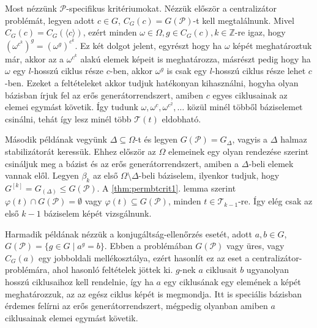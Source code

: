Most nézzünk $\mathcal{P}$-specifikus kritériumokat.
Nézzük először a centralizátor problémát, legyen adott $c \in G$, $C_G(c) = G(\mathcal{P})$-t kell megtalálnunk.
Mivel $C_G(c) = C_G(\langle c \rangle)$, ezért minden $\omega \in \Omega, g \in C_G(c), k \in \mathbb{Z}$-re igaz, hogy $(\omega^{c^k})^g = (\omega^g)^{c^k}$.
Ez két dolgot jelent, egyrészt hogy ha $\omega$ képét meghatároztuk már, akkor az a $\omega^{c^k}$ alakú elemek képeit is meghatározza,
másrészt pedig hogy ha $\omega$ egy $l$-hosszú ciklus része $c$-ben, akkor $\omega^g$ is csak egy $l$-hosszú ciklus része lehet $c$-ben.
Ezeket a feltételeket akkor tudjuk hatékonyan kihasználni, hogyha olyan bázisban írjuk fel az erős generátorrendszert, amiben $c$ egyes ciklusainak az elemei egymást követik.
Így tudunk $\omega, \omega^c, \omega^{c^2}, \dots$ közül minél többől báziselemet csinálni, tehát így lesz minél több $\mathcal{T}(t)$ eldobható.

Második példának vegyünk $\Delta \subseteq \Omega$-t és legyen $G(\mathcal{P}) = G_{\Delta}$, vagyis a $\Delta$ halmaz stabilizátorát keressük.
Ehhez először az $\Omega$ elemeinek egy olyan rendezése szerint csináljuk meg a bázist és az erős generátorrendszert, amiben a $\Delta$-beli elemek vannak elől.
Legyen $\beta_k$ az első $\Omega \setminus \Delta$-beli báziselem, ilyenkor tudjuk, hogy $G^{[k]} = G_{(\Delta)} \le G(\mathcal{P})$.
A \ref{thm:permbtcrit1}. lemma szerint $\varphi(t) \cap G(\mathcal{P}) = \emptyset$ vagy $\varphi(t) \subseteq G(\mathcal{P})$, minden $t \in \mathcal{T}_{k-1}$-re.
Így elég csak az első $k-1$ báziselem képét vizsgálnunk.

Harmadik példának nézzük a konjugáltság-ellenőrzés esetét, adott $a, b \in G$, $G(\mathcal{P}) = \{g \in G \mid a^g = b \}$.
Ebben a problémában $G(\mathcal{P})$ vagy üres, vagy $C_G(a)$ egy jobboldali mellékosztálya, ezért hasonlít ez az eset a centralizátor-problémára, ahol hasonló feltételek jöttek ki.
$g$-nek $a$ ciklusait $b$ ugyanolyan hosszú ciklusaihoz kell rendelnie, így ha $a$ egy ciklusának egy elemének a képét meghatározzuk, az az egész ciklus képét is megmondja.
Itt is speciális bázisban érdemes felírni az erős generátorrendszert, mégpedig olyanban amiben $a$ ciklusainak elemei egymást követik.
